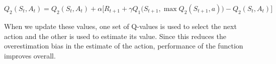 \documentclass{article}
\begin{document}
\begin{equation}
    Q_2(S_t, A_t) = Q_2(S_t, A_t) + \alpha \biggl[ R_{t+1} + \gamma Q_1 \bigl( S_{t+1}, \max Q_2(S_{t+1}, a) \bigr) - Q_2(S_t, A_t) \biggr]
\end{equation}

When we update these values, one set of Q-values is used to select the next action and the other is used to estimate its value. Since this reduces the overestimation bias in the estimate of the action, performance of the function improves overall.
\end{document}
